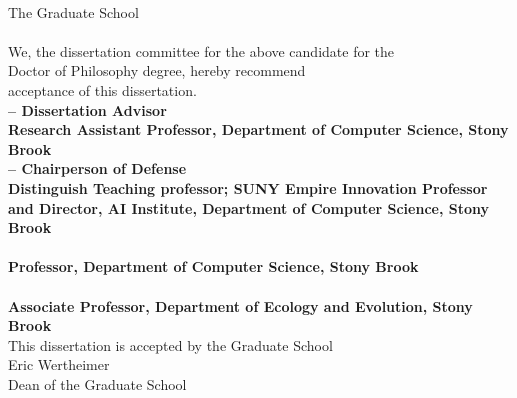 \documentclass[
12pt, %
oneside, %
english, %
singlespacing, %
liststotoc, %
parskip, %
headsepline, %
]{main} %
\begin{document}
\begin{center}
	\textbf{\univname}\\[0.5cm]
	The Graduate School\\[2cm]
	\textbf{\authorname}\\[2cm]
	We, the dissertation committee for the above candidate for the \\[0.5cm]
	Doctor of Philosophy degree, hereby recommend \\[0.5cm]
	acceptance of this dissertation. \\[1cm]
	
	\textbf{\href{http://www.robpatro.com/redesign/}{\supname} -- Dissertation Advisor\\
	Research Assistant Professor, Department of Computer Science, Stony Brook}\\ [1cm]
	
	\textbf{\href{https://www3.cs.stonybrook.edu/~skiena/}{\examinerThname} -- Chairperson of Defense\\
	Distinguish Teaching professor; SUNY Empire Innovation Professor and Director, AI Institute,
	Department of Computer Science, Stony Brook}\\ [1cm]
	
	\textbf{\href{http://www3.cs.stonybrook.edu/~bender/}{\examinerOname}\\
	Professor, Department of Computer Science, Stony Brook}\\ [1cm]
	
	\textbf{\href{https://life.bio.sunysb.edu/ee/restlab/Joshua_Rest.html}{\examinerJrname}\\
	Associate Professor, Department of Ecology and Evolution, Stony Brook}\\ [1cm]
	
	This dissertation is accepted by the Graduate School\\ [2cm]
	Eric Wertheimer\\ [0.5cm]
	Dean of the Graduate School\\ [0.5cm]
	
%
%
\end{center}
\end{document}
